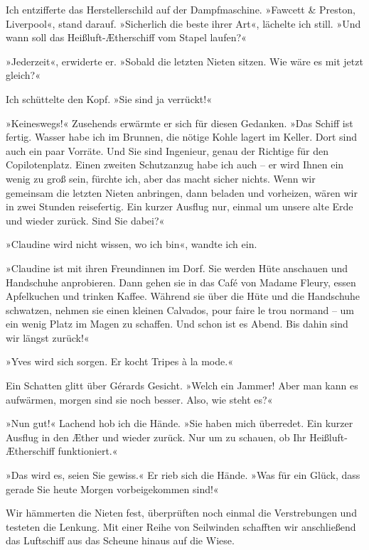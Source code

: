 Ich entzifferte das Herstellerschild auf der Dampfmaschine.
»Fawcett \& Preston, Liverpool«, stand darauf. »Sicherlich die
beste ihrer Art«, lächelte ich still. »Und wann soll das
Heißluft-Ætherschiff vom Stapel laufen?«

»Jederzeit«, erwiderte er. »Sobald die letzten Nieten sitzen. Wie
wäre es mit jetzt gleich?«

Ich schüttelte den Kopf. »Sie sind ja verrückt!«

»Keineswegs!« Zusehends erwärmte er sich für diesen Gedanken. »Das
Schiff ist fertig. Wasser habe ich im Brunnen, die nötige Kohle
lagert im Keller. Dort sind auch ein paar Vorräte. Und Sie sind
Ingenieur, genau der Richtige für den Copilotenplatz. Einen zweiten
Schutzanzug habe ich auch – er wird Ihnen ein wenig zu groß sein,
fürchte ich, aber das macht sicher nichts. Wenn wir gemeinsam die
letzten Nieten anbringen, dann beladen und vorheizen, wären wir in
zwei Stunden reisefertig. Ein kurzer Ausflug nur, einmal um unsere
alte Erde und wieder zurück. Sind Sie dabei?«

»Claudine wird nicht wissen, wo ich bin«, wandte ich ein.

»Claudine ist mit ihren Freundinnen im Dorf. Sie werden Hüte
anschauen und Handschuhe anprobieren. Dann gehen sie in das Café
von Madame Fleury, essen Apfelkuchen und trinken Kaffee. Während
sie über die Hüte und die Handschuhe schwatzen, nehmen sie einen
kleinen Calvados, pour faire le trou normand – um ein wenig Platz
im Magen zu schaffen. Und schon ist es Abend. Bis dahin sind wir
längst zurück!«

»Yves wird sich sorgen. Er kocht Tripes à la mode.«

Ein Schatten glitt über Gérards Gesicht. »Welch ein Jammer! Aber
man kann es aufwärmen, morgen sind sie noch besser. Also, wie steht
es?«

»Nun gut!« Lachend hob ich die Hände. »Sie haben mich überredet.
Ein kurzer Ausflug in den Æther und wieder zurück. Nur um zu
schauen, ob Ihr Heißluft-Ætherschiff funktioniert.«

»Das wird es, seien Sie gewiss.« Er rieb sich die Hände. »Was für
ein Glück, dass gerade Sie heute Morgen vorbeigekommen sind!«

\bigpar

Wir hämmerten die Nieten fest, überprüften noch einmal die
Verstrebungen und testeten die Lenkung. Mit einer Reihe von
Seilwinden schafften wir anschließend das Luftschiff aus das
Scheune hinaus auf die Wiese.


